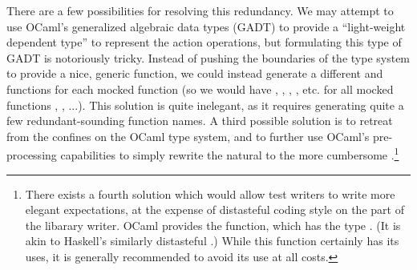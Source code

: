 There are a few possibilities for resolving this redundancy. We may
attempt to use OCaml's generalized algebraic data types (GADT) to
provide a ``light-weight dependent type'' to represent the action
operations, but formulating this type of GADT is notoriously
tricky. Instead of pushing the boundaries of the type system to
provide a nice, generic  function, we could instead
generate a different  and  functions for each
mocked function (so we would have , ,
, , etc. for all mocked functions
, , ...). This solution is quite inelegant, as it
requires generating quite a few redundant-sounding function names. A
third possible solution is to retreat from the confines on the OCaml
type system, and to further use OCaml's pre-processing capabilities to
simply rewrite the natural  to the more
cumbersome .\footnote{There exists a fourth
  solution which would allow test writers to write more elegant
  expectations, at the expense of distasteful coding style on the part
  of the libarary writer. OCaml provides the 
  function, which has the type . (It is akin
  to Haskell's similarly distasteful .) While
  this function certainly has its uses, it is generally recommended to
  avoid its use at all costs.}




